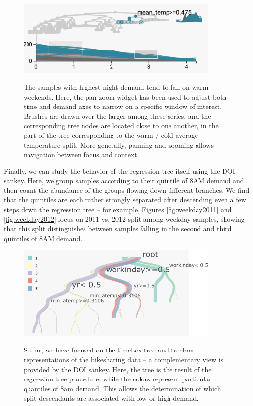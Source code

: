 \documentclass{report}
\begin{document}
\begin{figure}
{\centering \includegraphics[width=375px]{figure/treelapse/warm_weekend}}
\caption{The samples with highest night demand tend to fall on warm
  weekends. Here, the pan-zoom widget has been used to adjust both time and
  demand axes to narrow on a specific window of interest. Brushes are drawn over
  the larger among these series, and the corresponding tree nodes are located
  close to one another, in the part of the tree corresponding to the warm / cold
  average temperature split. More generally, panning and zooming allows
  navigation between focus and context.}\label{fig:warmweekend}
\end{figure}

Finally, we can study the behavior of the regression tree itself using
the DOI sankey. Here, we group samples according to their quintile of
8AM demand and then count the abundance of the groups flowing down
different branches. We find that the quintiles are each rather strongly
separated after descending even a few steps down the regression tree --
for example, Figures \ref{fig:weekday2011} and \ref{fig:weekday2012}
focus on 2011 vs. 2012 split among weekday samples, showing that this
split distinguishes between samples falling in the second and third
quintiles of 8AM demand.

\begin{figure}
{\centering \includegraphics[width=375px]{figure/treelapse/bike_sankey}}
\caption{So far, we have focused on the timebox tree and treebox representations
  of the bikesharing data -- a complementary view is provided by the DOI sankey.
  Here, the tree is the result of the regression tree procedure, while the
  colors represent particular quantiles of 8am demand. This allows the
  determination of which split descendants are associated with low or high
  demand.}\label{fig:bikesankey}
\end{figure}
\end{document}
